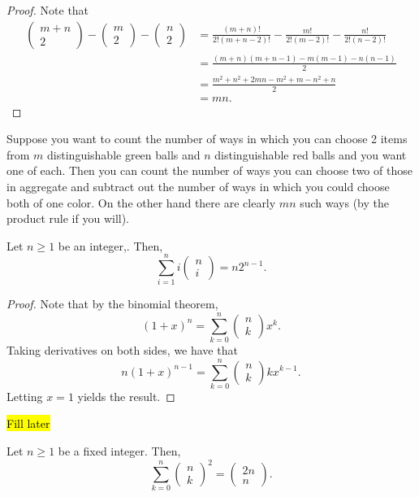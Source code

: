 \begin{proof}
Note that 
\begin{align*}
\left(\begin{array}{c}
m+n\\
2
\end{array}\right)-\left(\begin{array}{c}
m\\
2
\end{array}\right)-\left(\begin{array}{c}
n\\
2
\end{array}\right) & =\frac{\left(m+n\right)!}{2!\left(m+n-2\right)!}-\frac{m!}{2!\left(m-2\right)!}-\frac{n!}{2!\left(n-2\right)!}\\
 & =\frac{\left(m+n\right)\left(m+n-1\right)-m(m-1)-n(n-1)}{2}\\
 & =\frac{m^{2}+n^{2}+2mn-m^{2}+m-n^{2}+n}{2}\\
 & =mn.
\end{align*}
\end{proof}
\begin{rem*}
Suppose you want to count the number of ways in which you can choose
2 items from $m$ distinguishable green balls and $n$ distinguishable
red balls and you want one of each. Then you can count the number
of ways you can choose two of those in aggregate and subtract out
the number of ways in which you could choose both of one color. On
the other hand there are clearly $mn$ such ways (by the product rule
if you will).
\end{rem*}
\begin{prop}
\label{prop:prodSumBinomialCoefficients}Let $n\geq1$ be an integer,.
Then,
\[
\sum_{i=1}^{n}i\left(\begin{array}{c}
n\\
i
\end{array}\right)=n2^{n-1}.
\]
\end{prop}

\begin{proof}
Note that by the binomial theorem,
\[
\left(1+x\right)^{n}=\sum_{k=0}^{n}\left(\begin{array}{c}
n\\
k
\end{array}\right)x^{k}.
\]
Taking derivatives on both sides, we have that 
\[
n\left(1+x\right)^{n-1}=\sum_{k=0}^{n}\left(\begin{array}{c}
n\\
k
\end{array}\right)kx^{k-1}.
\]
Letting $x=1$ yields the result.
\end{proof}
\begin{rem*}
\hl{Fill later}
\end{rem*}
\begin{prop}
\label{prop:squaredSumBinomialCoefficients}Let $n\geq1$ be a fixed
integer. Then,
\[
\sum_{k=0}^{n}\left(\begin{array}{c}
n\\
k
\end{array}\right)^{2}=\left(\begin{array}{c}
2n\\
n
\end{array}\right).
\]
\end{prop}

